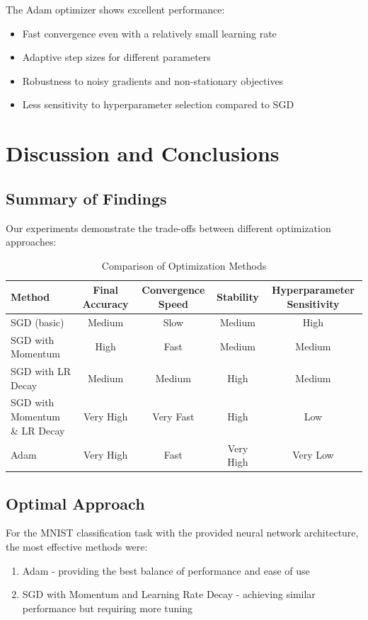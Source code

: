 \documentclass{article}
\begin{document}
The Adam optimizer shows excellent performance:
\begin{itemize}
    \item Fast convergence even with a relatively small learning rate
    \item Adaptive step sizes for different parameters
    \item Robustness to noisy gradients and non-stationary objectives
    \item Less sensitivity to hyperparameter selection compared to SGD
\end{itemize}

\section{Discussion and Conclusions}

\subsection{Summary of Findings}
Our experiments demonstrate the trade-offs between different optimization approaches:

\begin{table}[h]
\centering
\begin{tabular}{@{}lcccc@{}}
\toprule
\textbf{Method} & \textbf{Final Accuracy} & \textbf{Convergence Speed} & \textbf{Stability} & \textbf{Hyperparameter Sensitivity} \\
\midrule
SGD (basic) & Medium & Slow & Medium & High \\
SGD with Momentum & High & Fast & Medium & Medium \\
SGD with LR Decay & Medium & Medium & High & Medium \\
SGD with Momentum \& LR Decay & Very High & Very Fast & High & Low \\
Adam & Very High & Fast & Very High & Very Low \\
\bottomrule
\end{tabular}
\caption{Comparison of Optimization Methods}
\end{table}

\subsection{Optimal Approach}
For the MNIST classification task with the provided neural network architecture, the most effective methods were:
\begin{enumerate}
    \item Adam - providing the best balance of performance and ease of use
    \item SGD with Momentum and Learning Rate Decay - achieving similar performance but requiring more tuning
\end{enumerate}
\end{document}
